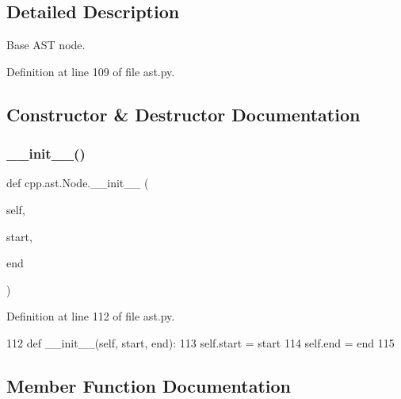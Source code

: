 \subsection{Detailed Description}
\begin{DoxyVerb}Base AST node.\end{DoxyVerb}
 

Definition at line 109 of file ast.\+py.



\subsection{Constructor \& Destructor Documentation}
\mbox{\label{classcpp_1_1ast_1_1Node_a2cbd6969346645259afc3be51faae904}} 
\subsubsection{\texorpdfstring{\+\_\+\+\_\+init\+\_\+\+\_\+()}{\_\_init\_\_()}}
{\footnotesize\ttfamily def cpp.\+ast.\+Node.\+\_\+\+\_\+init\+\_\+\+\_\+ (\begin{DoxyParamCaption}\item[{}]{self,  }\item[{}]{start,  }\item[{}]{end }\end{DoxyParamCaption})}



Definition at line 112 of file ast.\+py.


\begin{DoxyCode}
112     \textcolor{keyword}{def }\_\_init\_\_(self, start, end):
113         self.start = start
114         self.end = end
115 
\end{DoxyCode}


\subsection{Member Function Documentation}
\mbox{\label{classcpp_1_1ast_1_1Node_ab89915656a60c7b7c752e5baa607c532}} 
